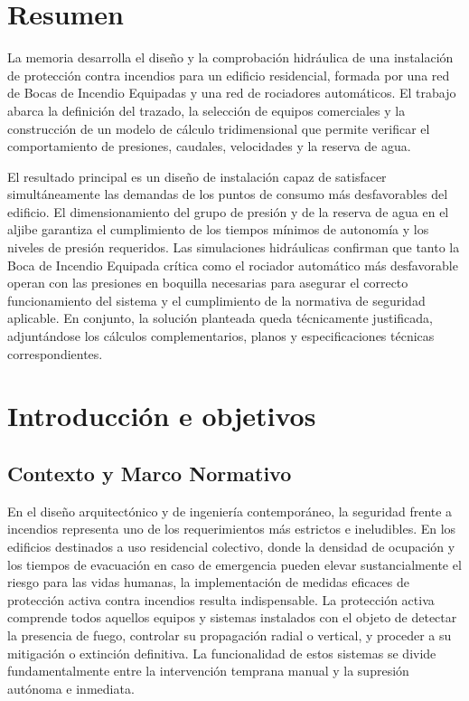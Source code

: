 \documentclass[12pt,a4paper]{article}
\begin{document}
\pagestyle{contenido}
\section*{Resumen}
{}

La memoria desarrolla el diseño y la comprobación hidráulica de una instalación de protección contra incendios para un edificio residencial, formada por una red de Bocas de Incendio Equipadas y una red de rociadores automáticos. El trabajo abarca la definición del trazado, la selección de equipos comerciales y la construcción de un modelo de cálculo tridimensional que permite verificar el comportamiento de presiones, caudales, velocidades y la reserva de agua.

El resultado principal es un diseño de instalación capaz de satisfacer simultáneamente las demandas de los puntos de consumo más desfavorables del edificio. El dimensionamiento del grupo de presión y de la reserva de agua en el aljibe garantiza el cumplimiento de los tiempos mínimos de autonomía y los niveles de presión requeridos. Las simulaciones hidráulicas confirman que tanto la Boca de Incendio Equipada crítica como el rociador automático más desfavorable operan con las presiones en boquilla necesarias para asegurar el correcto funcionamiento del sistema y el cumplimiento de la normativa de seguridad aplicable. En conjunto, la solución planteada queda técnicamente justificada, adjuntándose los cálculos complementarios, planos y especificaciones técnicas correspondientes.

\section{Introducción e objetivos}

\subsection{Contexto y Marco Normativo}

En el diseño arquitectónico y de ingeniería contemporáneo, la seguridad frente a incendios representa uno de los requerimientos más estrictos e ineludibles. En los edificios destinados a uso residencial colectivo, donde la densidad de ocupación y los tiempos de evacuación en caso de emergencia pueden elevar sustancialmente el riesgo para las vidas humanas, la implementación de medidas eficaces de protección activa contra incendios resulta indispensable. La protección activa comprende todos aquellos equipos y sistemas instalados con el objeto de detectar la presencia de fuego, controlar su propagación radial o vertical, y proceder a su mitigación o extinción definitiva. La funcionalidad de estos sistemas se divide fundamentalmente entre la intervención temprana manual y la supresión autónoma e inmediata.
\end{document}
